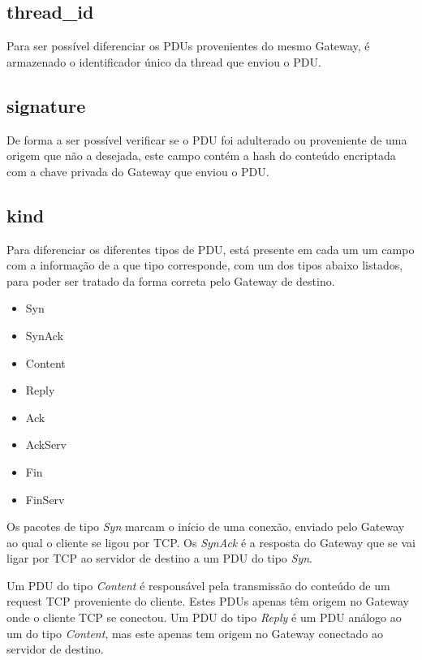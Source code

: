 \documentclass[a4paper]{report}
\begin{document}
\subsection{thread\_id}

Para ser possível diferenciar os PDUs provenientes do mesmo Gateway,
é armazenado o identificador único da thread que enviou o PDU.

\subsection{signature}

De forma a ser possível verificar se o PDU foi adulterado ou proveniente
de uma origem que não a desejada, este campo contém a hash do conteúdo
encriptada com a chave privada do Gateway que enviou o PDU.

\subsection{kind} \label{subs:kind}

Para diferenciar os diferentes tipos de PDU, está presente em cada um um campo
com a informação de a que tipo corresponde, com um dos tipos abaixo
listados, para poder ser tratado da forma correta pelo Gateway de 
destino.

\begin{itemize}
        \item Syn
        \item SynAck
        \item Content
        \item Reply
        \item Ack
        \item AckServ
        \item Fin
        \item FinServ
\end{itemize}

Os pacotes de tipo \textit{Syn} marcam o início de uma conexão, enviado
pelo Gateway ao qual o cliente se ligou por TCP. Os \textit{SynAck}
é a resposta do Gateway que se vai ligar por TCP ao servidor de destino
a um PDU do tipo \textit{Syn}.

Um PDU do tipo \textit{Content} é responsável pela transmissão do conteúdo
de um request TCP proveniente do cliente. Estes PDUs apenas têm origem
no Gateway onde o cliente TCP se conectou. Um PDU do tipo \textit{Reply}
é um PDU análogo ao um do tipo \textit{Content}, mas este apenas tem origem
no Gateway conectado ao servidor de destino.
\end{document}
